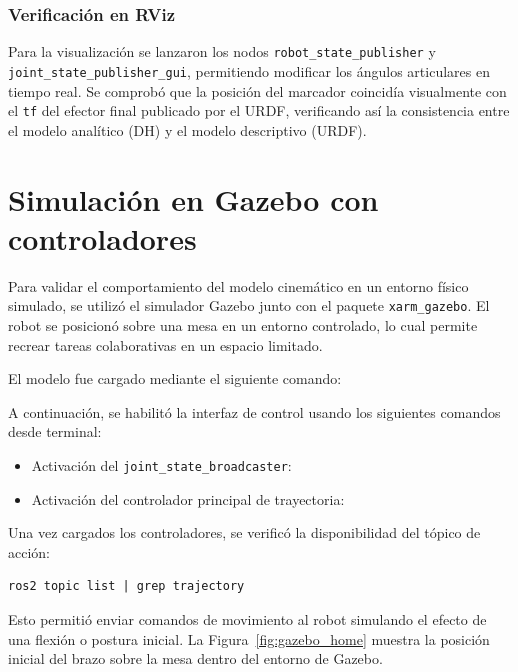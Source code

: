 \documentclass[conference]{IEEEtran}
\begin{document}
\subsubsection*{Verificación en RViz}

Para la visualización se lanzaron los nodos \texttt{robot\_state\_publisher} y \texttt{joint\_state\_publisher\_gui}, permitiendo modificar los ángulos articulares en tiempo real. Se comprobó que la posición del marcador coincidía visualmente con el \texttt{tf} del efector final publicado por el URDF, verificando así la consistencia entre el modelo analítico (DH) y el modelo descriptivo (URDF).


\section{Simulación en Gazebo con controladores}

Para validar el comportamiento del modelo cinemático en un entorno físico simulado, se utilizó el simulador Gazebo junto con el paquete \texttt{xarm\_gazebo}. El robot se posicionó sobre una mesa en un entorno controlado, lo cual permite recrear tareas colaborativas en un espacio limitado.

El modelo fue cargado mediante el siguiente comando:

\texttt{}

A continuación, se habilitó la interfaz de control usando los siguientes comandos desde terminal:

\begin{itemize}
    \item Activación del \texttt{joint\_state\_broadcaster}:\\
    \texttt{}

    \item Activación del controlador principal de trayectoria:\\
    \texttt{}
\end{itemize}

Una vez cargados los controladores, se verificó la disponibilidad del tópico de acción:
\begin{verbatim}
ros2 topic list | grep trajectory
\end{verbatim}

Esto permitió enviar comandos de movimiento al robot simulando el efecto de una flexión o postura inicial. La Figura~\ref{fig:gazebo_home} muestra la posición inicial del brazo sobre la mesa dentro del entorno de Gazebo.
\end{document}
